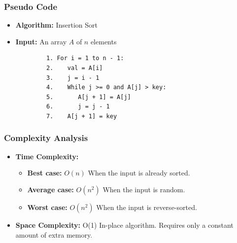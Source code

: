     \subsubsection{Pseudo Code}
        \begin{itemize}
            \item \textbf{Algorithm:} Insertion Sort
            \item \textbf{Input:} An array $A$ of $n$ elements
        \end{itemize}
        \begin{verbatim}
            1. For i = 1 to n - 1:
            2.    val = A[i]
            3.    j = i - 1
            4.    While j >= 0 and A[j] > key:
            5.       A[j + 1] = A[j]
            6.       j = j - 1
            7.    A[j + 1] = key
        \end{verbatim}
    \subsubsection{Complexity Analysis}
        \begin{itemize}
            \item \textbf{Time Complexity:}
            \begin{itemize}
                \item \textbf{Best case:} $O(n)$
                    \subitem When the input is already sorted.
                \item \textbf{Average case:} $O(n^2)$
                    \subitem When the input is random.
                \item \textbf{Worst case:} $O(n^2)$ 
                    \subitem When the input is reverse-sorted.
            \end{itemize}
            \item \textbf{Space Complexity:} O(1) 
                \subitem In-place algorithm. Requires only a constant amount of extra memory.
        \end{itemize}
        
